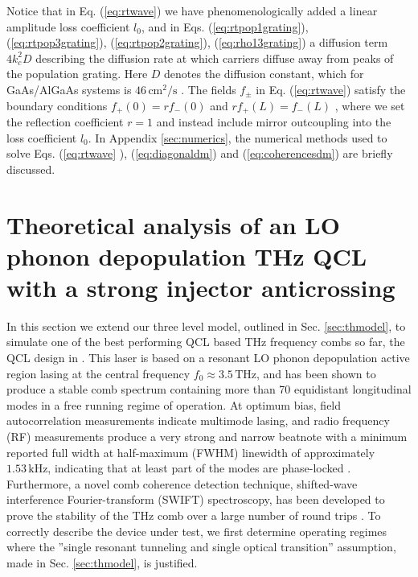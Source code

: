 \documentclass[10pt]{article}
\begin{document}
	Notice that in Eq. (\ref{eq:rtwave}) we have phenomenologically added a linear
	amplitude loss coefficient $l_{0}$, and in Eqs. (\ref{eq:rtpop1grating}),
	(\ref{eq:rtpop3grating}), ({\ref{eq:rtpop2grating}), (\ref{eq:rho13grating}) a
		diffusion term $4k_{c}^{2}D$ describing the diffusion rate at which carriers
		diffuse away from peaks of the population grating. Here $D$ denotes the
		diffusion constant, which for GaAs/AlGaAs systems is }${46\,\mathrm{cm}^{2}%
		/}\mathrm{s}${ \cite{wang2009mode,vukovic2016multimode}. }
	The fields $f_{\pm }$ in Eq. (\ref{eq:rtwave}) satisfy the boundary conditions
	$f_{+}\left( 0\right) =rf_{-}\left( 0\right) $ and
	$rf_{+}\left( L\right) =f_{-}\left( L\right) $ \cite{wang2007coherent},
	where we set the reflection coefficient $r=1$ and instead include mirror outcoupling
	into the loss coefficient $l_{0}$. In Appendix
	\ref{sec:numerics}, the numerical methods used to solve Eqs. (\ref{eq:rtwave}%
	), (\ref{eq:diagonaldm}) and (\ref{eq:coherencesdm}) are briefly discussed.
	
	\section{Theoretical analysis of an LO phonon depopulation THz QCL with a strong injector anticrossing}
	\label{sec:application}
	In this section we extend our three level model, outlined in Sec. \ref{sec:thmodel}, to simulate one of the best performing QCL based THz frequency combs so far, the QCL design in
	\cite{burghoff2014terahertz}. This laser is based on a resonant LO phonon
	depopulation active region lasing at the central frequency $f_{0}%
	\approx3.5{\,}\mathrm{THz}$, and has been shown to produce a stable comb
	spectrum containing more than 70 equidistant longitudinal modes in a free
	running regime of operation. At optimum bias, field autocorrelation
	measurements indicate multimode lasing, and radio frequency (RF) measurements
	produce a very strong and narrow beatnote with a minimum reported full width
	at half-maximum (FWHM) linewidth of approximately $1.53{\,}\mathrm{kHz}$,
	indicating that at least part of the modes are phase-locked
	\cite{hugi2012mid,burghoff2014terahertz,wienold2014evidence,rosch2015octave}.
	Furthermore, a novel comb coherence detection technique, shifted-wave
	interference Fourier-transform (SWIFT) spectroscopy, has been developed to
	prove the stability of the THz comb over a large number of round trips
	\cite{burghoff2015evaluating}. To correctly describe the device under test, we
	first determine operating regimes where the ''single resonant tunneling and
	single optical transition'' assumption, made in Sec. \ref{sec:thmodel}, is justified.
	
\end{document}
